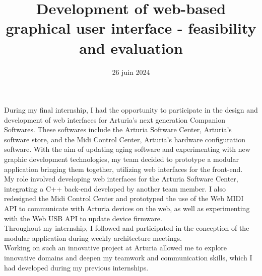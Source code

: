 \documentclass[francais]{rapportPFE}  %
\title{Development of web-based graphical user interface - feasibility and evaluation}
\date{26 juin 2024}
\begin{document}
\maketitle



\begin{ResumeMotsCles}

\begin{resumeEn}
During my final internship, I had the opportunity to participate in the design and development of web interfaces for Arturia's next generation Companion Softwares. These softwares include the Arturia Software Center, Arturia's software store, and the Midi Control Center, Arturia's hardware configuration software. With the aim of updating aging software and experimenting with new graphic development technologies, my team decided to prototype a modular application bringing them together, utilizing web interfaces for the front-end.\\
My role involved developing web interfaces for the Arturia Software Center, integrating a C++ back-end developed by another team member. I also redesigned the Midi Control Center and prototyped the use of the Web MIDI API to communicate with Arturia devices on the web, as well as experimenting with the Web USB API to update device firmware.\\
Throughout my internship, I followed and participated in the conception of the modular application during weekly architecture meetings. \\
Working on such an innovative project at Arturia allowed me to explore innovative domains and deepen my teamwork and communication skills, which I had developed during my previous internships. 
\end{resumeEn}




\end{ResumeMotsCles}
\end{document}
